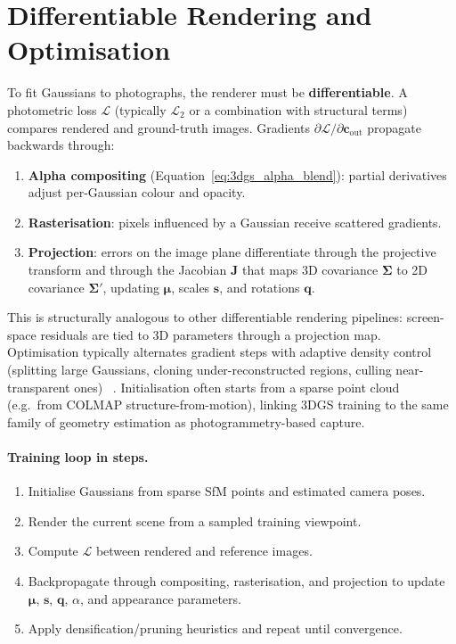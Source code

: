 \section{Differentiable Rendering and Optimisation}
\label{sec:3dgs_differentiable}

To fit Gaussians to photographs, the renderer must be \textbf{differentiable}. A
photometric loss $\mathcal{L}$ (typically $\mathcal{L}_2$ or a combination with
structural terms) compares rendered and ground-truth images. Gradients
$\partial \mathcal{L}/\partial \mathbf{c}_{\mathrm{out}}$ propagate backwards through:

\begin{enumerate}
    \item \textbf{Alpha compositing} (Equation~\ref{eq:3dgs_alpha_blend}): partial
    derivatives adjust per-Gaussian colour and opacity.

    \item \textbf{Rasterisation}: pixels influenced by a Gaussian receive scattered
    gradients.

    \item \textbf{Projection}: errors on the image plane differentiate through the
    projective transform and through the Jacobian $\mathbf{J}$ that maps 3D covariance
    $\boldsymbol{\Sigma}$ to 2D covariance $\boldsymbol{\Sigma}'$, updating
    $\boldsymbol{\mu}$, scales $\mathbf{s}$, and rotations $\mathbf{q}$.
\end{enumerate}

This is structurally analogous to other differentiable rendering pipelines:
screen-space residuals are tied to 3D parameters through a projection map. Optimisation
typically alternates gradient steps with adaptive density control (splitting
large Gaussians, cloning under-reconstructed regions, culling near-transparent ones) ~\cite{kerbl20233dgs}.
Initialisation often starts from a sparse point cloud (e.g.\ from COLMAP
structure-from-motion), linking 3DGS training to the same family of geometry
estimation as photogrammetry-based capture.

\paragraph{Training loop in steps.}
\begin{enumerate}
    \item Initialise Gaussians from sparse SfM points and estimated camera poses.
    \item Render the current scene from a sampled training viewpoint.
    \item Compute $\mathcal{L}$ between rendered and reference images.
    \item Backpropagate through compositing, rasterisation, and projection to update
    $\boldsymbol{\mu}$, $\mathbf{s}$, $\mathbf{q}$, $\alpha$, and appearance parameters.
    \item Apply densification/pruning heuristics and repeat until convergence.
\end{enumerate}

